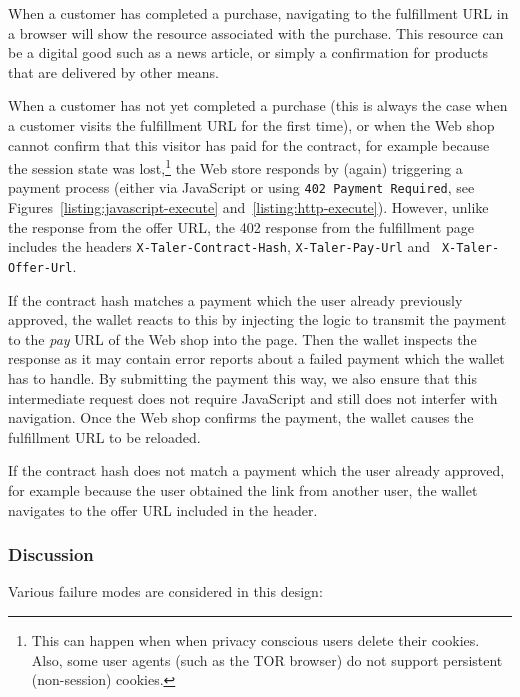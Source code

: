 \documentclass{llncs}
\begin{document}
When a customer has completed a purchase, navigating to the
fulfillment URL in a browser will show the resource associated with
the purchase.  This resource can be a digital good such as a news
article, or simply a confirmation for products that are delivered by
other means.

When a customer has not yet completed a purchase (this is always the
case when a customer visits the fulfillment URL for the first time),
or when the Web shop cannot confirm that this visitor has paid for the
contract, for example because the session state was
lost,\footnote{This can happen when when privacy conscious users
  delete their cookies.  Also, some user agents (such as the TOR
  browser) do not support persistent (non-session) cookies.} the Web
store responds by (again) triggering a payment process (either via
JavaScript or using {\tt 402 Payment Required}, see
Figures~\ref{listing:javascript-execute} and~\ref{listing:http-execute}).  However, unlike the response from
the offer URL, the 402 response from the fulfillment page includes the
headers {\tt X-Taler-Contract-Hash}, {\tt X-Taler-Pay-Url} and {\tt
  X-Taler-Offer-Url}.

If the contract hash matches a payment which the user already
previously approved, the wallet reacts to this by injecting the logic
to transmit the payment to the {\em pay} URL of the Web shop into
the page.  Then the wallet inspects the response as it may contain
error reports about a failed payment which the wallet has to handle.
By submitting the payment this way, we also ensure that this
intermediate request does not require JavaScript and still does not
interfer with navigation.  Once the Web shop confirms the payment, the
wallet causes the fulfillment URL to be reloaded.

If the contract hash does not match a payment which the user
already approved, for example because the user obtained the link
from another user, the wallet navigates to the offer URL included
in the header.

\subsubsection{Discussion}

Various failure modes are considered in this design:
\end{document}
